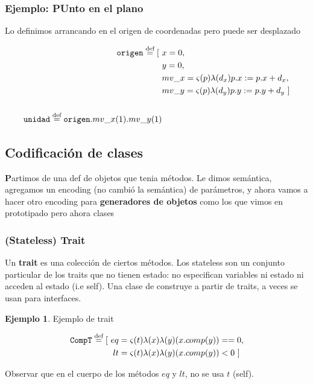 \documentclass{report}
\theoremstyle{definition} %
\newtheorem{example}{Ejemplo}[chapter]
\newenvironment{nota}[1]
    {\begin{leftbar}\textbf{#1}}
    {\end{leftbar}}
\newcommand{\eqdef}{\overset{\text{def}}{=}}
\newcommand{\assign}[2]{#1 := #2}
\begin{document}
\subsubsection{Ejemplo: PUnto en el plano}

Lo definimos arrancando en el origen de coordenadas pero puede ser desplazado

\begin{align*}
    \oname{origen} \eqdef \obj{
        &\attr{x}{0},\\
        &\attr{y}{0},\\
        &\attr{mv\_x}{
            \met{p}{
                \sabs{d_x}{
                    \assign{\sel{p}{x}}{\sel{p}{x} + d_x}
                }
            }
        },\\
        &\attr{mv\_y}{
            \met{p}{
                \sabs{d_y}{
                    \assign{\sel{p}{y}}{\sel{p}{y} + d_y}
                }
            }
        }
    }
    \\
    \\
    \oname{unidad} \eqdef
        \sel{\oname{origen}}{\sel{\sapp{mv\_x}{1}}{\sapp{mv\_y}{1}}}
\end{align*}

\subsection{Codificación de clases}

\begin{nota}
    Partimos de una def de objetos que tenia métodos. Le dimos semántica,
    agregamos un encoding (no cambió la semántica) de parámetros, y ahora vamos
    a hacer otro encoding para \textbf{generadores de objetos} como los que
    vimos en prototipado pero ahora clases
\end{nota}

\subsubsection{(Stateless) Trait}

Un \textbf{trait} es una colección de ciertos métodos. Los stateless son un
conjunto particular de los traits que no tienen estado: no especifican variables
ni estado ni acceden al estado (i.e self). Una clase de construye a partir de
traits, a veces se usan para interfaces.

\begin{example}
    Ejemplo de trait

    \begin{alignat*}{1}
        \oname{CompT} \eqdef \obj{
            \attr{eq&}{
                \met{t}{\sabs{x}{\sabs{y}{
                    (\scall{x}{comp}{y}) == 0
                }}}
            },\\
            \attr{lt&}{
                \met{t}{\sabs{x}{\sabs{y}{
                    (\scall{x}{comp}{y}) < 0
                }}}
            }
        }
    \end{alignat*}

    Observar que en el cuerpo de los métodos $eq$ y $lt$, no se usa $t$ (self).
\end{example}
\end{document}
